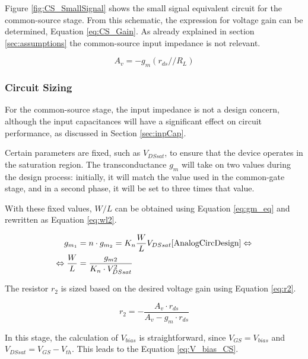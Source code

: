 Figure \ref{fig:CS_SmallSignal} shows the small signal equivalent circuit for the common-source stage. From this schematic, the expression for voltage gain can be determined, Equation \ref{eq:CS_Gain}. As already explained in section \ref{sec:assumptions} the common-source input impedance is not relevant.

\begin{equation}
    A_v = -g_m \left( r_{ds} // R_L \right)
    \label{eq:CS_Gain}
\end{equation}

\subsubsection{Circuit Sizing}

For the common-source stage, the input impedance is not a design concern, although the input capacitances will have a significant effect on circuit performance, as discussed in Section \ref{sec:inpCap}.

Certain parameters are fixed, such as $V_{DSsat}$, to ensure that the device operates in the saturation region. The transconductance $g_m$ will take on two values during the design process: initially, it will match the value used in the common-gate stage, and in a second phase, it will be set to three times that value.

With these fixed values, $W/L$ can be obtained using Equation \ref{eq:gm_eq} and rewritten as Equation \ref{eq:wl2}.

\begin{equation}
    \begin{split}
        g_{m_1} &= n\cdot g_{m_2} = K_{n}\frac{W}{L}V_{DSsat} \text{\cite{AnalogCircDesign}} \Leftrightarrow \\
        \Leftrightarrow \frac{W}{L} &= \frac{g_{m2}}{K_n \cdot V_{DSsat}^2}
    \end{split}
    \label{eq:wl2}
\end{equation}

The resistor $r_2$ is sized based on the desired voltage gain using Equation \ref{eq:r2}.

\begin{equation}
    r_2 = - \frac{A_v \cdot r_{ds}}{A_v - g_m \cdot r_{ds}}
    \label{eq:r2}
\end{equation}

In this stage, the calculation of $V_{bias}$ is straightforward, since $V_{GS} = V_{bias}$ and $V_{DSsat} = V_{GS} - V_{th}$. This leads to the Equation \ref{eq:V_bias_CS}.

